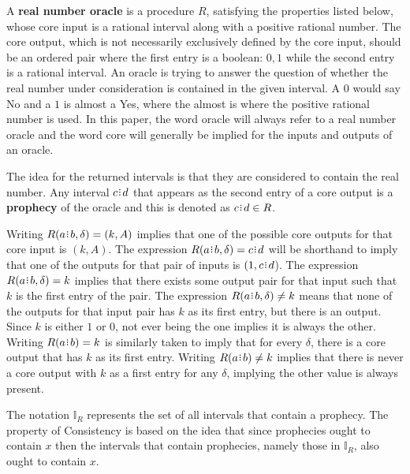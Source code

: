 \documentclass[12pt]{article}
\begin{document}
A \textbf{real number oracle} is a procedure $R$, satisfying the properties listed below, whose core input is a rational interval along with a positive rational number. The core output, which is not necessarily exclusively defined by the core input, should be an ordered pair where the first entry is a boolean:  $0, 1$ while the second entry is a rational interval. An oracle is trying to answer the question of whether the real number under consideration is contained in the given interval. A $0$ would say No and a $1$ is almost a Yes, where the almost is where the positive rational number is used.  In this paper, the word oracle will always refer to a real number oracle and the word core will generally be implied for the inputs and outputs of an oracle.


The idea for the returned intervals is that they are considered to contain the real number. Any interval $c\rint d$ that appears as the second entry of a core output is a \textbf{prophecy} of the oracle and this is denoted as $c\rint d \in R$. 

Writing $R(a\rint b, \delta)=(k ,A)$ implies that one of the possible core outputs for that core input is $(k, A)$. The expression $R(a\rint b, \delta) = c\rint d$ will be shorthand to imply that one of the outputs for that pair of inputs is $(1, c\rint d$).  The expression $R(a \rint b, \delta) = k$ implies that there exists some output pair for that input such that $k$ is the first entry of the pair. The expression $R(a\rint b, \delta) \neq k$ means that none of the outputs for that input pair has $k$ as its first entry, but there is an output. Since $k$ is either $1$ or $0$, not ever being the one implies it is always the other. Writing $R(a \rint b) = k$ is similarly taken to imply that for every $\delta$, there is a core output that has $k$ as its first entry. Writing $R(a \rint b) \neq k$ implies that there is never a core output with $k$ as a first entry for any $\delta$, implying the other value is always present. 

The notation $\mathbb{I}_R$ represents the set of all intervals that contain a prophecy. The property of Consistency is based on the idea that since prophecies ought to contain $x$ then the intervals that contain prophecies, namely those in $\mathbb{I}_R$,  also ought to contain $x$. 
\end{document}
